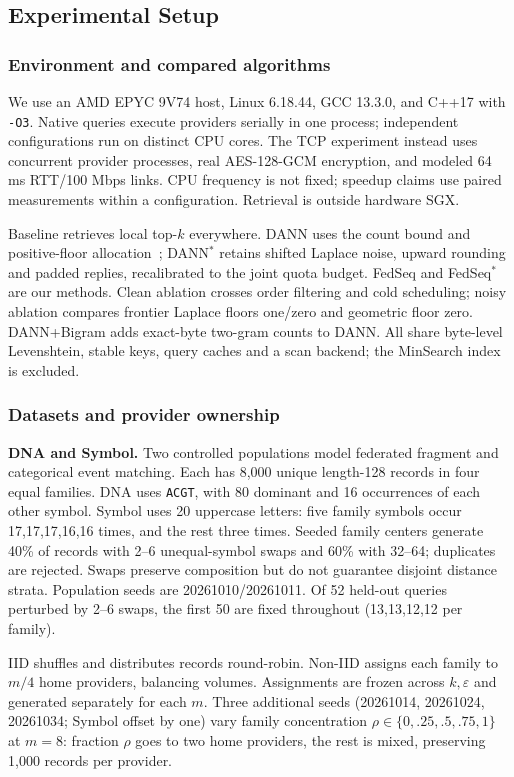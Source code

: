 \subsection{Experimental Setup}
\label{sec:setup}
\subsubsection{Environment and compared algorithms}
We use an AMD EPYC 9V74 host, Linux 6.18.44, GCC 13.3.0, and C++17 with \texttt{-O3}. Native queries execute providers serially in one process; independent configurations run on distinct CPU cores. The TCP experiment instead uses concurrent provider processes, real AES-128-GCM encryption, and modeled 64 ms RTT/100 Mbps links. CPU frequency is not fixed; speedup claims use paired measurements within a configuration. Retrieval is outside hardware SGX.

Baseline retrieves local top-$k$ everywhere. DANN uses the count bound and positive-floor allocation~\cite{fedknn}; DANN$^*$ retains shifted Laplace noise, upward rounding and padded replies, recalibrated to the joint quota budget. FedSeq and FedSeq$^*$ are our methods. Clean ablation crosses order filtering and cold scheduling; noisy ablation compares frontier Laplace floors one/zero and geometric floor zero. DANN+Bigram adds exact-byte two-gram counts to DANN. All share byte-level Levenshtein, stable keys, query caches and a scan backend; the MinSearch index is excluded.

\subsubsection{Datasets and provider ownership}
\textbf{DNA and Symbol.} Two controlled populations model federated fragment and categorical event matching. Each has 8,000 unique length-128 records in four equal families. DNA uses \texttt{ACGT}, with 80 dominant and 16 occurrences of each other symbol. Symbol uses 20 uppercase letters: five family symbols occur 17,17,17,16,16 times, and the rest three times. Seeded family centers generate 40\% of records with 2--6 unequal-symbol swaps and 60\% with 32--64; duplicates are rejected. Swaps preserve composition but do not guarantee disjoint distance strata. Population seeds are 20261010/20261011. Of 52 held-out queries perturbed by 2--6 swaps, the first 50 are fixed throughout (13,13,12,12 per family).

IID shuffles and distributes records round-robin. Non-IID assigns each family to $m/4$ home providers, balancing volumes. Assignments are frozen across $k,\varepsilon$ and generated separately for each $m$. Three additional seeds (20261014, 20261024, 20261034; Symbol offset by one) vary family concentration $\rho\in\{0,.25,.5,.75,1\}$ at $m=8$: fraction $\rho$ goes to two home providers, the rest is mixed, preserving 1,000 records per provider.

